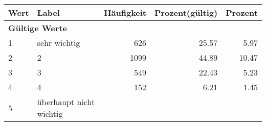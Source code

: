      \begin{longtable}{lXrrr}
     \toprule
     \textbf{Wert} & \textbf{Label} & \textbf{Häufigkeit} & \textbf{Prozent(gültig)} & \textbf{Prozent} \\
     \endhead
     \midrule
     \multicolumn{5}{l}{\textbf{Gültige Werte}}\\

     1 &
     \multicolumn{1}{X}{ sehr wichtig   } &


       \num{626} &
       \num[round-mode=places,round-precision=2]{25.57} &
         \num[round-mode=places,round-precision=2]{5.97} \\

     2 &
     \multicolumn{1}{X}{ 2   } &


       \num{1099} &
       \num[round-mode=places,round-precision=2]{44.89} &
         \num[round-mode=places,round-precision=2]{10.47} \\

     3 &
     \multicolumn{1}{X}{ 3   } &


       \num{549} &
       \num[round-mode=places,round-precision=2]{22.43} &
         \num[round-mode=places,round-precision=2]{5.23} \\

     4 &
     \multicolumn{1}{X}{ 4   } &


       \num{152} &
       \num[round-mode=places,round-precision=2]{6.21} &
         \num[round-mode=places,round-precision=2]{1.45} \\

     5 &
     \multicolumn{1}{X}{ überhaupt nicht wichtig   } &



\end{longtable}
